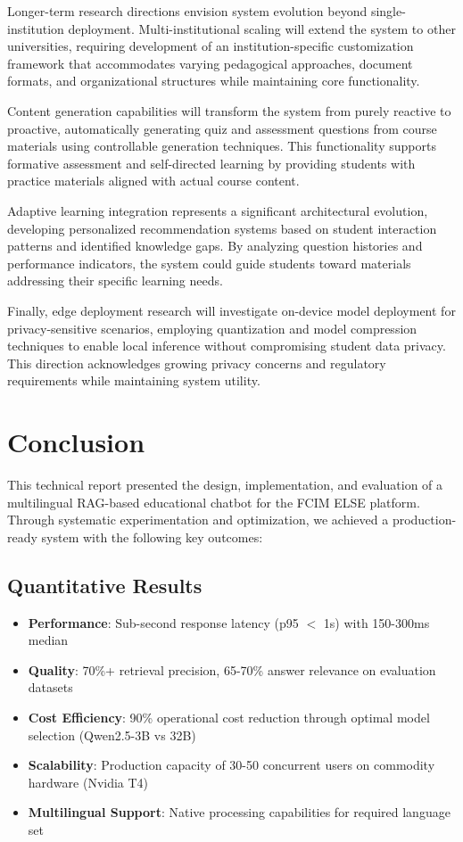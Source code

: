 \documentclass[12pt,a4paper]{article}
\begin{document}
Longer-term research directions envision system evolution beyond single-institution deployment. Multi-institutional scaling will extend the system to other universities, requiring development of an institution-specific customization framework that accommodates varying pedagogical approaches, document formats, and organizational structures while maintaining core functionality.

Content generation capabilities will transform the system from purely reactive to proactive, automatically generating quiz and assessment questions from course materials using controllable generation techniques. This functionality supports formative assessment and self-directed learning by providing students with practice materials aligned with actual course content.

Adaptive learning integration represents a significant architectural evolution, developing personalized recommendation systems based on student interaction patterns and identified knowledge gaps. By analyzing question histories and performance indicators, the system could guide students toward materials addressing their specific learning needs.

Finally, edge deployment research will investigate on-device model deployment for privacy-sensitive scenarios, employing quantization and model compression techniques to enable local inference without compromising student data privacy. This direction acknowledges growing privacy concerns and regulatory requirements while maintaining system utility.

\section{Conclusion}

This technical report presented the design, implementation, and evaluation of a multilingual RAG-based educational chatbot for the FCIM ELSE platform. Through systematic experimentation and optimization, we achieved a production-ready system with the following key outcomes:

\subsection{Quantitative Results}
\begin{itemize}
    \item \textbf{Performance}: Sub-second response latency (p95 $<$ 1s) with 150-300ms median
    \item \textbf{Quality}: 70\%+ retrieval precision, 65-70\% answer relevance on evaluation datasets
    \item \textbf{Cost Efficiency}: 90\% operational cost reduction through optimal model selection (Qwen2.5-3B vs 32B)
    \item \textbf{Scalability}: Production capacity of 30-50 concurrent users on commodity hardware (Nvidia T4)
    \item \textbf{Multilingual Support}: Native processing capabilities for required language set
\end{itemize}
\end{document}
